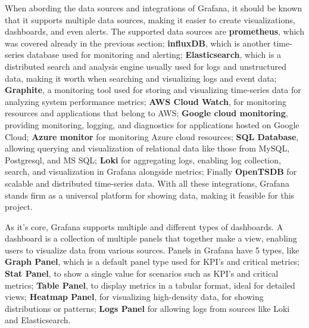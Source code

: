 When abording the data sources and integrations of Grafana, it should be known that it supports multiple data sources, making it easier to create visualizations, dashboards, and even alerts. The supported data sources are \textbf{prometheus}, which was covered already in the previous section; \textbf{influxDB}, which is another time-series database used for monitoring and alerting; \textbf{Elasticsearch}, which is a distributed search and analysis engine usually used for logs and unstructured data, making it worth when searching and visualizing logs and event data; \textbf{Graphite}, a monitoring tool used for storing and visualizing time-series data for analyzing system performance metrics; \textbf{AWS Cloud Watch}, for monitoring resources and applications that belong to AWS; \textbf{Google cloud monitoring}, providing monitoring, logging, and diagnostics for applications hosted on Google Cloud; \textbf{Azure monitor} for monitoring Azure cloud resources; \textbf{SQL Database}, allowing querying and visualization of relational data like those from MySQL, Postgresql, and MS SQL; \textbf{Loki} for aggregating logs, enabling log collection, search, and visualization in Grafana alongside metrics; Finally \textbf{OpenTSDB} for scalable and distributed time-series data. With all these integrations, Grafana stands firm as a universal platform for showing data, making it feasible for this project.

As it's core, Grafana supports multiple and different types of dashboards. A dashboard is a collection of multiple panels that together make a view, enabling users to visualize data from various sources. Panels in Grafana have 5 types, like \textbf{Graph Panel}, which is a default panel type used for KPI's and critical metrics; \textbf{Stat Panel}, to show a single value for scenarios such as KPI's and critical metrics; \textbf{Table Panel}, to display metrics in a tabular format, ideal for detailed views; \textbf{Heatmap Panel}, for visualizing high-density data, for showing distributions or patterns; \textbf{Logs Panel} for allowing logs from sources like Loki and Elasticsearch.

